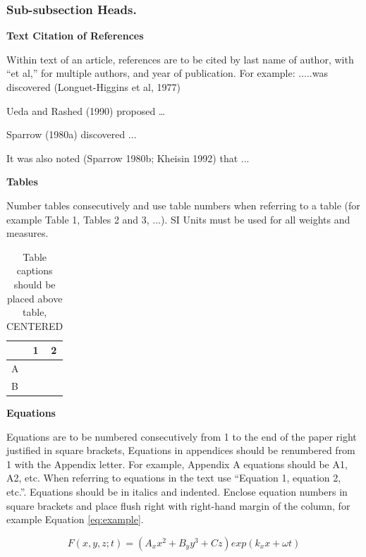 \subsubsection{Sub-subsection Heads.}

\textbf{Text Citation of References}

Within text of an article, references are to be cited by last name of author, with “et al,” for multiple authors, and year of publication.   For example:   .....was discovered (Longuet-Higgins et al, 1977)

\hspace{35pt}Ueda and Rashed (1990) proposed …

\hspace{35pt}Sparrow (1980a) discovered ...

\hspace{35pt}It was also noted (Sparrow 1980b; Kheisin 1992) that ...\vspace{7pt}

\textbf{Tables}

Number tables consecutively and use table numbers when referring to a table (for example Table 1, Tables 2 and 3, ...). SI Units must be used for all weights and measures.

\begin{table}[H]
    \centering
    \caption{Table captions should be placed above table, CENTERED}
    \begin{tabular}{|l|c|c|}\hline
         & 1 & 2 \\\hline
         A & & \\\hline
         B & & \\\hline
    \end{tabular}
    \label{tab:my_label}
\end{table}

\textbf{Equations}

Equations are to be numbered consecutively from 1 to the end of the paper right justified in square brackets, Equations in appendices should be renumbered from 1 with the Appendix letter.   For example, Appendix A equations should be A1, A2, etc.  When referring to equations in the text use “Equation 1, equation 2, etc.”. Equations should be in italics and indented. Enclose equation numbers in square brackets and place flush right with right-hand margin of the column, for example Equation \ref{eq:example}.

\begin{equation}
    F(x,y,z;t) = (A_xx^2 + B_yy^3 + Cz)exp(k_xx + \omega t)
    \label{eq:example}
\end{equation}

